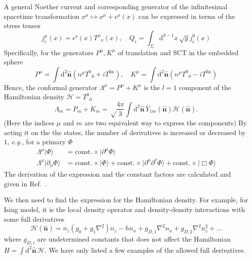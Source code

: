 \documentclass{timesjhep}
\begin{document}
A general Noether current and corresponding generator of the infinitesimal spacetime transformation $x^\mu\mapsto x^\mu+\epsilon^\mu(x)$ can be expressed in terms of the stress tensor 
\begin{equation}
    j_\epsilon^\mu(x)=\epsilon^\nu(x)T^\mu{}_\nu(x),\quad Q_\epsilon=\int_\Sigma\mathrm{d}^{d-1}x\,\sqrt{g}j_\epsilon^0(x) 
\end{equation}
Specifically, for the generators $P^\mu,K^\mu$ of translation and SCT in the embedded sphere
\begin{equation}
    P^\mu=\int\mathrm{d}^2\hat{\mathbf{n}}(n^\mu T^0{}_0+iT^{0\mu}),\quad K^\mu=\int\mathrm{d}^2\hat{\mathbf{n}}(n^\mu T^0{}_0-iT^{0\mu})
\end{equation} 
Hence, the conformal generator $\Lambda^\mu=P^\mu+K^\mu$ is the $l=1$ component of the Hamiltonian density $\mathscr{H}=T^0{}_0$
\begin{equation}
    \Lambda_m=P_m+K_m=\sqrt\frac{4\pi}{3}\int\mathrm{d}^2\hat{\mathbf{n}}\,\bar{Y}_{1m}(\hat{\mathbf{n}})\mathscr{H}(\hat{\mathbf{n}}).
\end{equation}
(Here the indices $\mu$ and $m$ are two equivalent way to express the components) By acting it on the the states, the number of derivatives is increased or decreased by $1$, \textit{e.g.}, for a primary $\Phi$
\begin{align}
    \Lambda^\mu|\Phi\rangle&=\mathrm{const.}\times|\partial^\mu\Phi\rangle\nonumber\\     \Lambda^\mu|\partial_\mu\Phi\rangle&=\mathrm{const.}\times|\Phi\rangle+\mathrm{const.}\times|\partial^\mu\partial^\nu\Phi\rangle+\mathrm{const.}\times|\Box\Phi\rangle
\end{align}
The derivation of the expression and the constant factors are calculated and given in Ref.~\cite{}.

We then need to find the expression for the Hamiltonian density. For example, for Ising model, it is the local density operator and density-density interactions with some full derivatives 
\begin{equation}
    \mathscr{H}(\hat{\mathbf{n}})=n_z\left(g_0+g_1\nabla^2\right)n_z-hn_x+g_{D,1}\nabla^2n_x+g_{D,2}\nabla^2n_z^2+\dots
\end{equation}
where $g_{D,i}$ are undetermined constants that does not affect the Hamiltonian $H=\int\mathrm{d}^2\hat{\mathbf{n}}\,\mathscr{H}$. We have only listed a few examples of the allowed full derivatives. 
\end{document}
